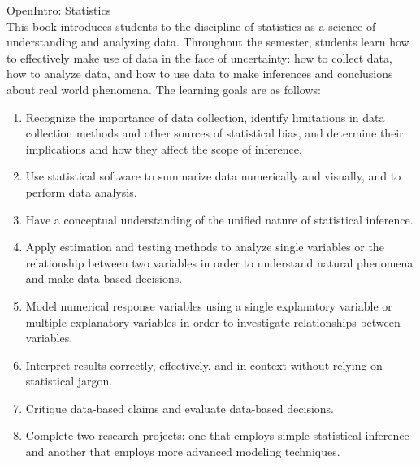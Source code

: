 \documentclass[11pt]{article}
\begin{document}
{\LARGE \textcolor{oiB}{OpenIntro: Statistics}} \\


This book introduces students to the discipline of statistics as a science of understanding and analyzing data. Throughout the semester, students learn how to effectively make use of data in the face of uncertainty: how to collect data, how to analyze data, and how to use data to make inferences and conclusions about real world phenomena. The learning goals are as follows:
 
\begin{enumerate}
\renewcommand\labelenumi{\textcolor{oiB}{\textbf{Goal \theenumi.}}}
\item Recognize the importance of data collection, identify limitations in data collection methods and other sources of statistical bias, and determine their implications and how they affect the scope of inference.
\item Use statistical software to summarize data numerically and visually, and to perform data analysis. 
\item Have a conceptual understanding of the unified nature of statistical inference.
\item Apply estimation and testing methods to analyze single variables or the relationship between two variables in order to understand natural phenomena and make data-based decisions.
\item Model numerical response variables using a single explanatory variable or multiple explanatory variables in order to investigate relationships between variables.
\item Interpret results correctly, effectively, and in context without relying on statistical jargon.
\item Critique data-based claims and evaluate data-based decisions.
\item Complete two research projects: one that employs simple statistical inference and another that employs more advanced modeling techniques.
\end{enumerate}
\end{document}
